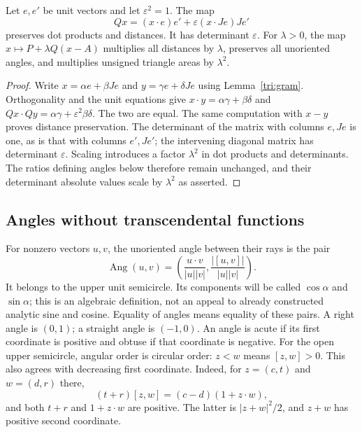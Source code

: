 \begin{proposition}
\label{tri:motions}
Let $e,e'$ be unit vectors and let $\varepsilon^2=1$.  The map
\[
 Qx=(x\mathbin{\cdot}e)e'+
       \varepsilon(x\mathbin{\cdot}Je)Je'
\]
preserves dot products and distances.  It has determinant $\varepsilon$.
For $\lambda>0$, the map $x\mapsto P+\lambda Q(x-A)$ multiplies all
distances by $\lambda$, preserves all unoriented angles, and multiplies
unsigned triangle areas by $\lambda^2$.
\end{proposition}
\begin{proof}
Write $x=\alpha e+\beta Je$ and $y=\gamma e+\delta Je$ using
Lemma~\ref{tri:gram}.  Orthogonality and the unit equations give
$x\mathbin{\cdot}y=\alpha\gamma+\beta\delta$ and
$Qx\mathbin{\cdot}Qy=\alpha\gamma+\varepsilon^2\beta\delta$.
The two are equal.  The same computation with $x-y$ proves distance
preservation.  The determinant of the matrix with columns $e,Je$ is one,
as is that with columns $e',Je'$; the intervening diagonal matrix has
determinant $\varepsilon$.  Scaling introduces a factor $\lambda^2$
in dot products and determinants.  The ratios defining angles below
therefore remain unchanged, and their determinant absolute values scale
by $\lambda^2$ as asserted.
\end{proof}

\subsection{Angles without transcendental functions}

For nonzero vectors $u,v$, the unoriented angle between their rays is the pair
\[
 \operatorname{Ang}(u,v)=
 \left(\frac{u\mathbin{\cdot}v}{|u||v|},
       \frac{|[u,v]|}{|u||v|}\right).
\]
It belongs to the upper unit semicircle.  Its components will be called
$\cos\alpha$ and $\sin\alpha$; this is an algebraic definition, not an appeal
to already constructed analytic sine and cosine.  Equality of angles means
equality of these pairs.  A right angle is $(0,1)$; a straight angle is
$(-1,0)$.  An angle is acute if its first coordinate is positive and obtuse if
that coordinate is negative.  For the open upper semicircle, angular order
is circular order: $z<w$ means $[z,w]>0$.  This also agrees with decreasing
first coordinate.  Indeed, for $z=(c,t)$ and $w=(d,r)$ there,
\[
 (t+r)[z,w]=(c-d)(1+z\mathbin{\cdot}w),
\]
and both $t+r$ and $1+z\mathbin{\cdot}w$ are positive.  The latter is
$|z+w|^2/2$, and $z+w$ has positive second coordinate.

